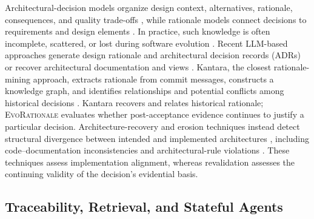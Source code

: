 \documentclass[10pt,conference]{IEEEtran}
\begin{document}
Architectural-decision models organize design context, alternatives, rationale, consequences, and quality trade-offs \cite{Jansen2005Decisions,Tyree2005Decisions,Tang2006Rationale,VanHeesch2012Framework}, while rationale models connect decisions to requirements and design elements \cite{Tang2007Rationale}. In practice, such knowledge is often incomplete, scattered, or lost during software evolution \cite{Tofan2011Vaporization,Demir2024Survey,Ahmeti2024ADRPractice,Santana2026ADR}. Recent LLM-based approaches generate design rationale and architectural decision records (ADRs) or recover architectural documentation and views \cite{Zhou2026Rationale,Gupta2026Context,DeLuca2026CIAO,Miryala2026Views}. Kantara, the closest rationale-mining approach, extracts rationale from commit messages, constructs a knowledge graph, and identifies relationships and potential conflicts among historical decisions \cite{Dhaouadi2025Kantara}. Kantara recovers and relates historical rationale; \textsc{EvoRationale} evaluates whether post-acceptance evidence continues to justify a particular decision. Architecture-recovery and erosion techniques instead detect structural divergence between intended and implemented architectures \cite{DeSilva2012Erosion,Li2022Erosion,Zhang2026SemRef}, including code--documentation inconsistencies and architectural-rule violations \cite{Kiecker2026Cascade,Su2026Violations,Bucaioni2024Continuous}. These techniques assess implementation alignment, whereas revalidation assesses the continuing validity of the decision's evidential basis.

\subsection{Traceability, Retrieval, and Stateful Agents}
\end{document}
